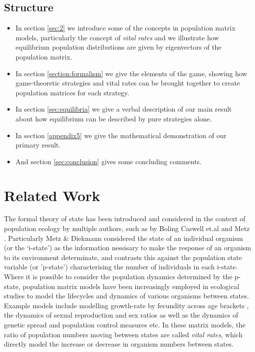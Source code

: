 \subsection{Structure}
\begin{itemize}
\item In section \ref{sec:2} we introduce some of the concepts in population matrix models, particularly the concept of \textit{vital rates} and we illustrate how equilibrium population distributions are given by eigenvectors of the population matrix.
\item In section \ref{section:formalism} we give the elements of the game, showing how game-theoretic strategies and vital rates can be brought together to create population matrices for each strategy.
\item In section \ref{sec:equilibria} we give a verbal description of our main result about how equilibrium can be described by pure strategies alone.
\item In section \ref{appendix5} we give the mathematical demonstration of our primary result.
\item And section \ref{sec:conclusion} gives some concluding comments.
\end{itemize}


\section{Related Work}\label{sec:-1}

The formal theory of state has been introduced and considered in the context of population ecology by multiple authors, 
such as by Boling \cite{BOLING1973485} Caswell et.al \cite{nla.cat-vn662318} and Metz \cite{Metz1977}. Particularly Metz \& Diekmann\cite{nla.cat-vn2330051} considered the state of an individual organism (or the `i-state') as the information nessisary to make the response of an organism to its environment determinate, and contrasts this against the population state variable (or 'p-state') characterising the number of individuals in each i-state. 
Where it is possible to consider the population dynamics determined by the p-state, population matrix models have been increasingly employed in ecological studies to model the lifecycles and dynamics of various organisms between states.\cite{doi:10.1111/j.1461-0248.2010.01540.x}
Example models include modelling growth-rate by fecundity across age brackets \cite{leslie}, the dynamics of sexual reproduction and sex ratios \cite{Shyu2018,doi:10.1111/1365-2664.12177} as well as the dynamics of genetic spread and population control measures \cite{DEVRIES2020108875} etc.
In these matrix models, the ratio of population numbers moving between states are called \textit{vital rates}, which directly model the increase or decrease in organism numbers between states.

